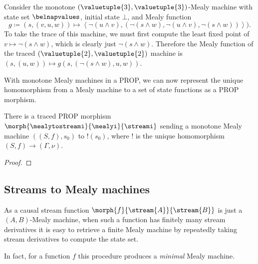 \begin{example}\label{ex:trace-mealy}
    Consider the monotone \((\valuetuple{3},\valuetuple{3})\)-Mealy machine with
    state set \(\belnapvalues\), initial state \(\bot\), and Mealy function \[
        g \coloneqq (s, (v, u, w))
        \mapsto \left\langle
                \neg(u \land v),
                (\neg(s \land w), \neg(u \land v), \neg(s \land w))
        \right\rangle
    ).\]
    To take the trace of this machine, we must first compute the least fixed
    point of \(v \mapsto \neg(s \land w)\), which is clearly just
    \(\neg(s \land w)\).
    Therefore the Mealy function of the traced
    \((\valuetuple{2}, \valuetuple{2})\) machine is \(
        (s, (u, w)) \mapsto g(s, (\neg(s \land w), u, w))
    \).
\end{example}

With monotone Mealy machines in a PROP, we can now represent the unique
homomorphism from a Mealy machine to a set of state functions as a PROP
morphism.

\begin{proposition}
    There is a traced PROP morphism
    \(\morph{\mealytostreami}{\mealyi}{\streami}\) sending a monotone Mealy
    machine \(\left((S, f), s_0\right)\) to \(!(s_0)\), where \(!\) is the
    unique homomorphism \((S,f) \to (\Gamma,\nu)\).
\end{proposition}
\begin{proof}
\end{proof}

\subsection{Streams to Mealy machines}

As a causal stream function \(\morph{f}{\stream{A}}{\stream{B}}\) is just a
\((A,B)\)-Mealy machine, when such a function has finitely many stream
derivatives it is easy to retrieve a finite Mealy machine by repeatedly
taking stream derivatives to compute the state set.

\begin{example}
\end{example}

In fact, for a function \(f\) this procedure produces a \emph{minimal} Mealy
machine.

